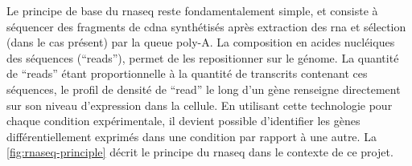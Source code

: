 \documentclass[../main.tex]{subfiles}
\begin{document}
		

		Le principe de base du \gls{rnaseq} reste fondamentalement simple, et consiste à séquencer des fragments de \gls{cdna} synthétisés après extraction des \gls{rna} et sélection (dans le cas présent) par la queue poly-A.
		La composition en acides nucléiques des séquences (``reads''), permet de les repositionner sur le génome.
		La quantité de ``reads'' étant proportionnelle à la quantité de transcrits contenant ces séquences, le profil de densité de ``read'' le long d'un gène renseigne directement sur son niveau d'expression dans la cellule.
		En utilisant cette technologie pour chaque condition expérimentale, il devient possible d'identifier les gènes différentiellement exprimés dans une condition par rapport à une autre.
		La \autoref{fig:rnaseq-principle} décrit le principe du \gls{rnaseq} dans le contexte de ce projet.
\end{document}

